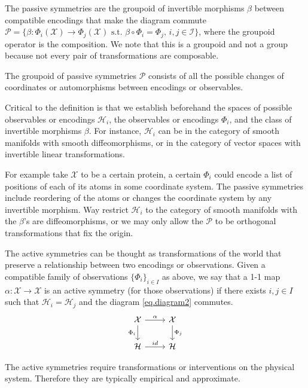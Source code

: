 \documentclass{article}
\theoremstyle{plain}
\theoremstyle{definition}
\theoremstyle{remark}
\begin{document}
The passive symmetries are the groupoid of invertible morphisms $\beta$ between compatible encodings that make the diagram commute $\mathcal P = \{\beta: \Phi_i(\mathcal X) \to \Phi_j(\mathcal X) \text{ s.t. } \beta\circ \Phi_i = \Phi_j, \, i,j\in \mathcal I \}$, where the groupoid operator is the composition. We note that this is a groupoid and not a group because not every pair of transformations are composable. 

The groupoid of passive symmetries $\mathcal P$ consists of all the possible changes of coordinates or automorphisms between encodings or observables.

Critical to the definition is that we establish beforehand the spaces of possible observables or encodings $\mathcal H_i$, the observables or encodings $\Phi_i$, and the class of invertible morphisms $\beta$. For instance, $\mathcal H_i$ can be in the category of smooth manifolds with smooth diffeomorphisms, or in the category of vector spaces with invertible linear transformations.   

For example take $\mathcal X$ to be a certain protein, a certain $\Phi_i$ could encode a list of positions of each of its atoms in some coordinate system. The passive symmetries include reordering of the atoms or changes the coordinate system by any invertible morphism. Way restrict $\mathcal H_i$ to the category of smooth manifolds with the $\beta$'s are diffeomorphisms, or we may only allow the $\mathcal P$ to be orthogonal transformations that fix the origin.  

The active symmetries can be thought as transformations of the world that preserve a relationship between two encodings or observations. Given a compatible family of observations $\{\Phi_i\}_{i\in I}$ as above, we say that a 1-1 map $\alpha:\mathcal X \to \mathcal X$ is an active symmetry (for those observations) if there exists $i,j\in I$ such that $\mathcal H_i = \mathcal H_j$ and the diagram  \eqref{eq.diagram2} commutes. 
\begin{equation}\label{eq.diagram2}
\begin{tikzcd}[]
  {\cal X}\arrow[r,"\alpha"] \arrow[d,"\Phi_i",swap] & {\cal X}  \arrow[d,"\Phi_j"]\\
{\mathcal H} \arrow[r,"id"]  & {\mathcal H} 
\end{tikzcd}
\end{equation}

The active symmetries require transformations or interventions on the physical system. Therefore they are typically empirical and approximate.
\end{document}
